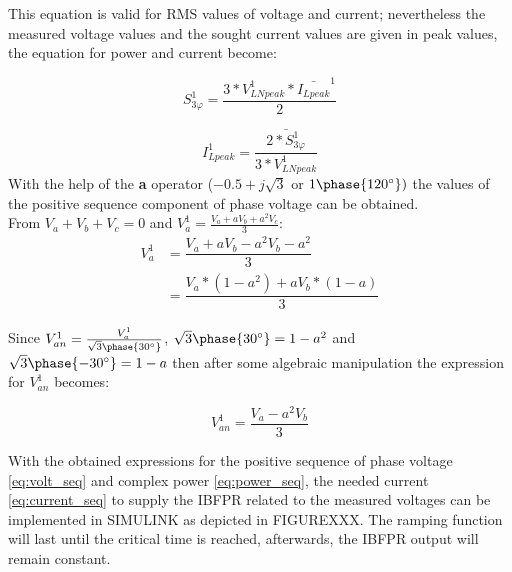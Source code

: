 This equation is valid for RMS values of voltage and current; nevertheless the measured voltage values and the sought current values are given in peak values, the equation for power and current become:

\begin{equation}
\label{eq:power_seq}
S_{3\varphi}^1=\dfrac{3*V_{LNpeak}^1*\bar{I_{Lpeak}}^1}{2}
\end{equation}


 

\begin{equation}
\label{eq:current_seq}
I_{Lpeak}^1=\dfrac{\bar{2*S_{3\varphi}^1}}{3*V_{LNpeak}^1}
\end{equation}
With the help of the \textbf{a} operator ($-0.5+j\sqrt{3}$ or $ 1\phase{120^{\circ}}) $ the values of the positive sequence component of phase voltage can be obtained. \\
From $ V_a +V_b+V_c=0$ and $ V_a^1=\frac{V_a+ aV_b+a^2 V_c}{3} $:
\begin{align*}
	 V_a^1 & =\dfrac{V_a+ aV_b-a^2 V_b-a^2}{3} \\
	& =\dfrac{V_a*(1-a^2)+ aV_b*(1-a)}{3} 
\end{align*}

Since $V_{an}^1=\frac{V_a^1}{\sqrt{3}\phase{30^{\circ}}}$, $\sqrt{3}\phase{30^{\circ}}=1-a^2 $ and $ \sqrt{3}\phase{-30^{\circ}}=1-a $ then after some algebraic manipulation the expression for $ V_{an}^1 $ becomes:

\begin{equation}
	\label{eq:volt_seq}
	V_{an}^1=\dfrac{V_a-a^2 V_b}{3}
\end{equation}

With the obtained expressions  for the positive sequence of phase voltage \eqref{eq:volt_seq} and complex power \eqref{eq:power_seq}, the needed current \eqref{eq:current_seq} to supply the IBFPR related to the measured voltages can be implemented in SIMULINK as depicted in FIGUREXXX. The ramping function will last until the critical time is reached, afterwards, the IBFPR output will remain constant.

